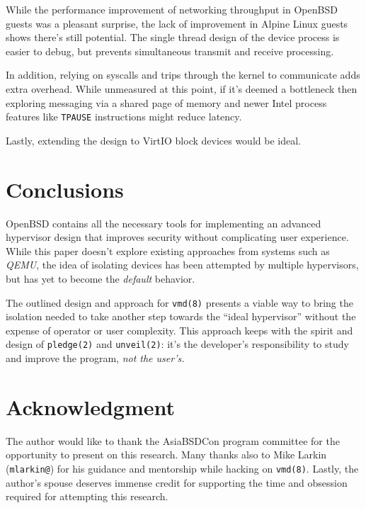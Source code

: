 \documentclass[conference]{IEEEtran}
\begin{document}
While the performance improvement of networking throughput in OpenBSD
guests was a pleasant surprise, the lack of improvement in Alpine
Linux guests shows there's still potential. The single thread design
of the device process is easier to debug, but prevents simultaneous
transmit and receive processing.

In addition, relying on syscalls and trips through the kernel to
communicate adds extra overhead. While unmeasured at this point, if
it's deemed a bottleneck then exploring messaging via a shared page of
memory and newer Intel process features like \texttt{TPAUSE}
instructions might reduce latency.

Lastly, extending the design to VirtIO block devices would be ideal.


\vspace{5mm}
\section{Conclusions}
OpenBSD contains all the necessary tools for implementing an advanced
hypervisor design that improves security without complicating user
experience. While this paper doesn't explore existing approaches from
systems such as \emph{QEMU}, the idea of isolating devices has been
attempted by multiple hypervisors, but has yet to become the
\emph{default} behavior.

The outlined design and approach for \texttt{vmd(8)} presents a viable
way to bring the isolation needed to take another step towards the
``ideal hypervisor'' without the expense of operator or user
complexity. This approach keeps with the spirit and design of
\texttt{pledge(2)} and \texttt{unveil(2)}: it's the developer's
responsibility to study and improve the program, \emph{not the
user's.}


\vspace{5mm}
\section*{Acknowledgment}
The author would like to thank the AsiaBSDCon program committee for
the opportunity to present on this research. Many thanks also to Mike
Larkin (\texttt{mlarkin@}) for his guidance and mentorship while
hacking on \texttt{vmd(8)}. Lastly, the author's spouse deserves
immense credit for supporting the time and obsession required for
attempting this research.
\end{document}

